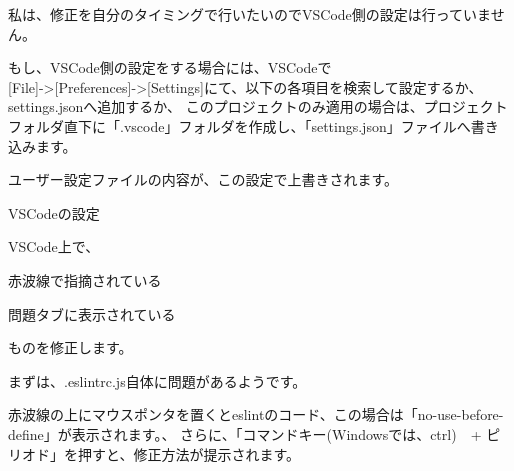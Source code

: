 \vspace*{\baselineskip}

私は、修正を自分のタイミングで行いたいのでVSCode側の設定は行っていません。

\vspace*{\baselineskip}

もし、VSCode側の設定をする場合には、VSCodeで\\[0pt]
[File]{-}\textgreater{}[Preferences]{-}\textgreater{}[Settings]にて、以下の各項目を検索して設定するか、settings.jsonへ追加するか、
このプロジェクトのみ適用の場合は、プロジェクトフォルダ直下に「.vscode」フォルダを作成し、「settings.json」ファイルへ書き込みます。

ユーザー設定ファイルの内容が、この設定で上書きされます。

\def\startercodeblockfontsize{}
\begin{starterprogram}[]{VSCodeの設定}\end{starterprogram}

VSCode上で、\\[0pt]

\begin{starteritemize}
\item 赤波線で指摘されている
\item 問題タブに表示されている
\end{starteritemize}

\vspace*{\baselineskip}

ものを修正します。

\vspace*{\baselineskip}

まずは、.eslintrc.js自体に問題があるようです。

赤波線の上にマウスポンタを置くとeslintのコード、この場合は「no{-}use{-}before{-}define」が表示されます。、
さらに、「コマンドキー(Windowsでは、ctrl)　+ ピリオド」を押すと、修正方法が提示されます。

